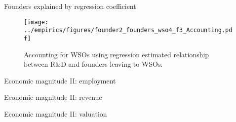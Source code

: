 \documentclass[english,usenames,dvipsnames,handout]{beamer}
\begin{document}
\begin{frame}{Founders explained by regression coefficient}\label{regs_economic_significance}
	\hyperlink{economic_magnitude}{}
	\begin{figure}[!htb]
		\texttt{[image: ../empirics/figures/founder2\_founders\_wso4\_f3\_Accounting.pdf]}
		\caption{\small Accounting for WSOs using regression estimated relationship between R\&D and founders leaving to WSOs.}
	\end{figure}
\end{frame}


\begin{frame}{Economic magnitude II: employment}\label{regs_startup_lifecycle_employment}
	\hyperlink{economic_magnitude}{}
	\begin{table}[!htb]
		\Tiny
		\centering
		
		\caption{\footnotesize Dependent variable is logarithm of employee count divided by number of founders. Indepdendent variable is fraction of founders whose previous employer was in the same industry.} 
		\label{table:startupLifeCycle_founder2founders_lemployeecount_founder2}
	\end{table}
\end{frame}


\begin{frame}{Economic magnitude II: revenue}\label{regs_startup_lifecycle_revenue}
	\hyperlink{economic_magnitude}{}
	\begin{table}[!htb]
		\Tiny
		\centering
		
		\caption{\footnotesize Dependent variable is logarithm of revenue divided by number of founders. Indepdendent variable is fraction of founders whose previous employer was in the same industry.} 
		\label{table:startupLifeCycle_founder2founders_lrevenue_founder2}
	\end{table}
\end{frame}


\begin{frame}{Economic magnitude II: valuation}\label{regs_startup_lifecycle_valuation}
	\hyperlink{economic_magnitude}{}
	\begin{table}[!htb]
		\Tiny
		\centering
		
		\caption{\footnotesize Dependent variable is logarithm of valuation divided by number of founders. Indepdendent variable is fraction of founders whose previous employer was in the same industry.} 
		\label{table:startupLifeCycle_founder2founders_lpostvalusd_founder2}
	\end{table}
\end{frame}
\end{document}
